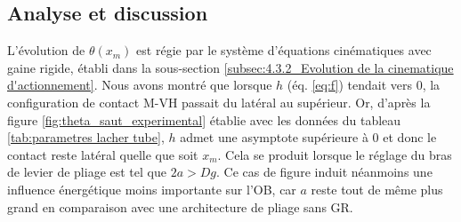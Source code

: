 	\subsection{Analyse et discussion}
	\label{subsec:6.2.2_Analyse et discussion}
L'évolution de $\theta(x_m)$ est régie par le système d'équations cinématiques avec gaine rigide, établi dans la sous-section \ref{subsec:4.3.2_Evolution de la cinematique d'actionnement}. Nous avons montré que lorsque $h$ (éq. \ref{eq:f}) tendait vers 0, la configuration de contact M-VH passait du latéral au supérieur. Or, d'après la figure \ref{fig:theta_saut_experimental} établie avec les données du tableau \ref{tab:parametres lacher tube}, $h$ admet une asymptote supérieure à 0 et donc le contact reste latéral quelle que soit $x_m$. Cela se produit lorsque le réglage du bras de levier de pliage est tel que $2a>Dg$. Ce cas de figure induit néanmoins une influence énergétique moins importante sur l'OB, car $a$ reste tout de même plus grand en comparaison avec une architecture de pliage sans GR.
